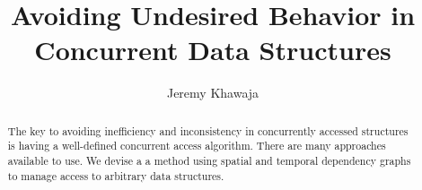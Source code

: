 \documentclass[english]{article}
\begin{document}
	
\hypersetup{
	linktoc=all,     %
	linkcolor=blue,  %
}

\title{Avoiding Undesired Behavior in Concurrent Data Structures}
\author{Jeremy Khawaja}
\maketitle

\begin{abstract}
		The key to avoiding inefficiency and inconsistency in concurrently accessed structures is having a well-defined concurrent access algorithm. There are many approaches available to use. We devise a a method using spatial and temporal dependency graphs to manage access to arbitrary data structures.
\end{abstract}
\twocolumn








\end{document}
